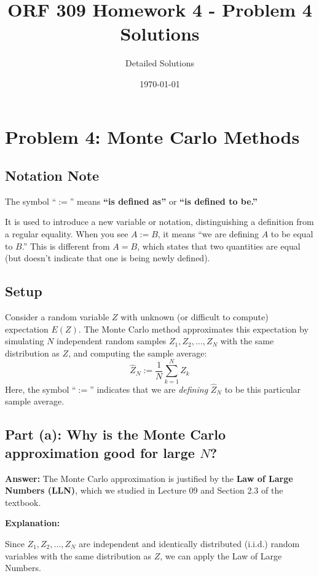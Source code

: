 \documentclass[11pt]{article}
\title{ORF 309 Homework 4 - Problem 4 Solutions}
\author{Detailed Solutions}
\date{\today}
\begin{document}
\maketitle

\section*{Problem 4: Monte Carlo Methods}

\subsection*{Notation Note}
The symbol ``$:=$'' means \textbf{``is defined as''} or \textbf{``is defined to be.''}

It is used to introduce a new variable or notation, distinguishing a definition from a regular equality. When you see $A := B$, it means ``we are defining $A$ to be equal to $B$.'' This is different from $A = B$, which states that two quantities are equal (but doesn't indicate that one is being newly defined).

\subsection*{Setup}
Consider a random variable $Z$ with unknown (or difficult to compute) expectation $E(Z)$. The Monte Carlo method approximates this expectation by simulating $N$ independent random samples $Z_1, Z_2, \ldots, Z_N$ with the same distribution as $Z$, and computing the sample average:
\[
\hat{Z}_N := \frac{1}{N} \sum_{k=1}^{N} Z_k
\]
Here, the symbol ``$:=$'' indicates that we are \emph{defining} $\hat{Z}_N$ to be this particular sample average.

\subsection*{Part (a): Why is the Monte Carlo approximation good for large $N$?}

\textbf{Answer:} The Monte Carlo approximation is justified by the \textbf{Law of Large Numbers (LLN)}, which we studied in Lecture 09 and Section 2.3 of the textbook.

\vspace{0.5em}

\textbf{Explanation:}

Since $Z_1, Z_2, \ldots, Z_N$ are independent and identically distributed (i.i.d.) random variables with the same distribution as $Z$, we can apply the Law of Large Numbers.
\end{document}
